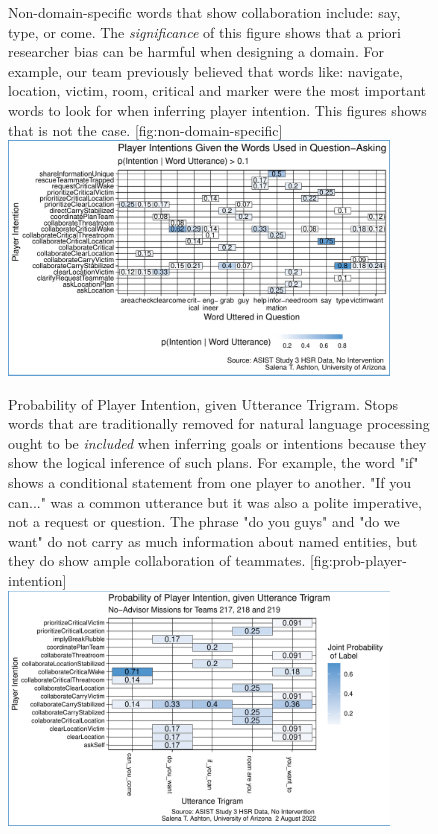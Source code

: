\begin{figure}
    \centering
    \begin{sidecaption}{%
        Non-domain-specific words that show collaboration include: say, type, or
        come. The \emph{significance} of this figure shows that a priori researcher
        bias can be harmful when designing a domain. For example, our team
        previously believed that words like: navigate, location, victim, room,
        critical and marker were the most important words to look for when
        inferring player intention. This figures shows that is not the case.
    }[fig:non-domain-specific]
    \includegraphics[width=0.9\textwidth]{../images/QuestionUtterances_Link_STA.pdf}
    \end{sidecaption}
\end{figure}


\begin{figure}
    \begin{sidecaption}{%
        Probability of Player Intention, given Utterance Trigram. Stops words
        that are traditionally removed for natural language processing ought to
        be \emph{included} when inferring goals or intentions because they show
        the logical inference of such plans. For example, the word "if" shows a
        conditional statement from one player to another. "If you can..." was a
        common utterance but it was also a polite imperative, not a request or
        question. The phrase "do you guys" and "do we want" do not carry as
        much information about named entities, but they do show ample
        collaboration of teammates.
    }[fig:prob-player-intention]
    \includegraphics[width=0.9\textwidth]{../images/FINAL_1_trigram_Utterances_STA.pdf}
\end{sidecaption}
\end{figure}

